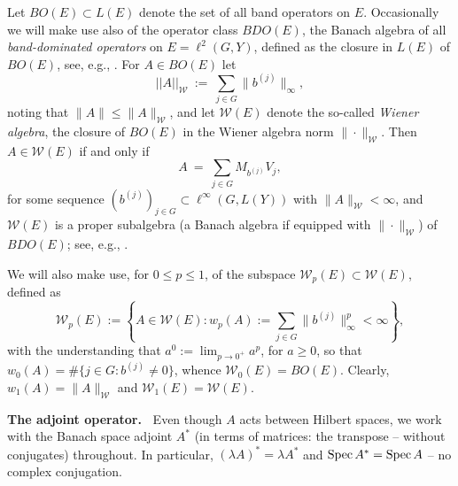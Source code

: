 \documentclass{article}
\newcommand\W{{\mathcal W}}
\newcommand\w{{w}}
\newcommand\Spec{{\rm Spec}\,}  %
\numberwithin{equation}{section}   %
\numberwithin{figure}{section}  %
\begin{document}
Let $BO(E)\subset L(E)$ denote the set of all band operators on $E$. Occasionally we will make use also of the operator class $BDO(E)$, the Banach algebra of all {\em band-dominated operators} on $E=\ell^2(G,Y)$, defined as the closure in $L(E)$ of $BO(E)$, see, e.g., \cite{LiBook}. For $A\in BO(E)$ let
\[
||A||_{\W}\ :=\ \sum_{j\in G}\|b^{(j)}\|_\infty,
\]
noting that $\|A\|\leq \|A\|_\W$,
and let $\W(E)$ denote the  so-called {\sl Wiener algebra}, the closure   of $BO(E)$ in the Wiener algebra norm $\|\cdot\|_\W$. Then $A\in \W(E)$ if and only if
\begin{equation} \label{eq:AW}
A\ =\ \sum_{j\in G}M_{b^{(j)}}V_j,
\end{equation}
for some sequence $(b^{(j)})_{j\in G} \subset \ell^\infty(G,L(Y))$ with $\|A\|_{\W} <\infty$, and $\W(E)$ is  
a proper subalgebra (a Banach algebra if equipped with $\|\cdot\|_\W$) of $BDO(E)$; see, e.g., \cite{LiBook}.

We will also make use, for $0\leq p\leq 1$, of the subspace $\W_p(E)\subset \W(E)$, defined as
\begin{equation} \label{eq:Wpdef}
\W_p(E) := \left\{A\in \W(E): \w_p(A) := \sum_{j\in G}\|b^{(j)}\|^p_\infty < \infty\right\},
\end{equation}
with the understanding that $a^0:= \lim_{p\to 0^+} a^p$, for $a\geq 0$, so that $\w_0(A) = \#\{j\in G: b^{(j)}\neq 0\}$, whence $\W_0(E)=BO(E)$. Clearly, $w_1(A)=\|A\|_{\W}$ and $\W_1(E)=\W(E)$.




\medskip\noindent
{\bf The adjoint operator.\ }
Even though $A$ acts between Hilbert spaces, we work with the Banach space adjoint $A^*$ (in terms of matrices: the transpose -- without conjugates) throughout. In particular, $(\lambda A)^*=\lambda A^*$ and $\Spec A^*=\Spec A$ -- no complex conjugation.
\end{document}
